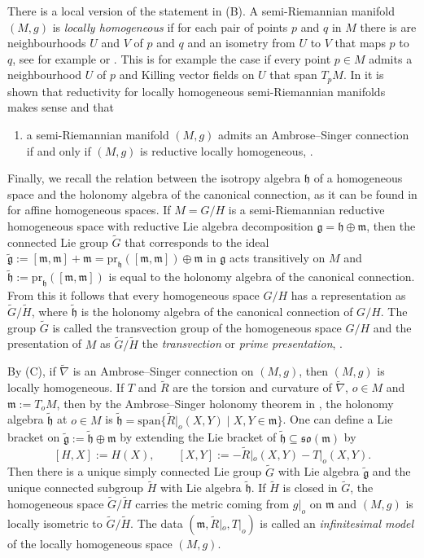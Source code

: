 \documentclass[11pt,a4paper]{amsart}
\def\blu{\color[rgb]{0,0,1}}
\newcommand{\tg}{\widetilde{\g}}
\renewcommand{\th}{\widetilde{\h}}
\newcommand{\tnab}{\widetilde{\nabla}}
\newcommand{\tR}{\widetilde{R}}
\newcommand{\g}{\mathfrak{g}}
\newcommand{\h}{\mathfrak{h}}
\newcommand{\m}{\mathfrak{m}}
\newcommand{\+}{\oplus}
\newcommand{\so}{\mathfrak{so}}
\renewcommand{\span}{\mathrm{span}}
\newcommand{\1}{\mathbf{1}}
\newcommand{\Tcom}[1]{\marginpar{\scriptsize \blu\tt #1}}
\newcommand{\<}{\langle}
\renewcommand{\>}{\rangle}
\theoremstyle{definition}
\theoremstyle{plain}
\numberwithin{equation}{section}
\begin{document}
There is a local version of the statement in (B). A semi-Riemannian manifold $(M,g)$ is {\em locally homogeneous} if for each pair  of points  $p$ and $q$ in $M$ there is are neighbourhoods $U$ and $V$ of $p$ and $q$ and an isometry from $U$ to $V$ that maps $p$ to $q$, see for example \cite[Section 7.3]{ambra-gromov91} or \cite[Definition 1.4.6]{CalvarusoCastrillon-Lopez19}. This is for example the case if every point $p\in M$ admits a neighbourhood $U$ of $p$ and Killing vector fields on $U$ that span $T_pM$. In \cite[Section 3.1]{CalvarusoCastrillon-Lopez19} it is shown that reductivity for locally homogeneous semi-Riemannian manifolds makes sense and that
 \begin{enumerate}
\item[(C)] a semi-Riemannian manifold $(M,g)$ admits an Ambrose--Singer connection if and only if $(M,g)$ is reductive locally homogeneous, \cite[Theorems 3.1.14 and 3.1.15]{CalvarusoCastrillon-Lopez19}.
\end{enumerate}
Finally, we recall the relation between the isotropy algebra $\h$ of a homogeneous space and the holonomy algebra of the canonical connection, as it can be found in \cite[Theorems I.25 and I.33]{Kowalski80} for affine homogeneous spaces.
If
 $M=G/H$ is a semi-Riemannian reductive homogeneous space with reductive Lie algebra decomposition $\g=\h\+\m$, then the connected Lie group $\widetilde{G}$ that corresponds to the ideal $\widetilde{\g}:=[\m,\m]+\m=\mathrm{pr}_\h([\m,\m])\+\m$ in $\g$ acts transitively on $M$ and  $\th:=\mathrm{pr}_\h([\m,\m])$ is equal to the holonomy algebra of the canonical connection.  
From this it follows that every homogeneous space $G/H$ has a representation as $\widetilde{G}/\widetilde{H}$,  where $\th$ is the holonomy algebra of the canonical connection of $G/H$. The group $\widetilde{G}$ is  called the transvection group of the homogeneous space $G/H$ and the presentation of $M$ as $\widetilde{G}/\widetilde{H}$ the {\em transvection} or {\em prime presentation}, 
\cite[page 41]{Kowalski80}. 

By  (C), if $\tnab$ is an Ambrose--Singer connection on $(M,g)$, then $(M,g)$ is locally homogeneous. If $T$ and  $\tR$ are the torsion and curvature of $\tnab$, $o\in M$ and $\m:=T_oM$, then by the Ambrose--Singer holonomy theorem in \cite{as}, 
the  holonomy algebra $\th$ at $o\in M$
is  $\th  =\span\{\tR|_o(X,Y)\mid  X,Y\in \m\}$. 
One can define a Lie bracket on $\tg:=\th\+\m$ by extending the Lie bracket of $\th\subseteq \so(\m)$ by
\[[ H,X]:=H(X),\qquad [ X,Y ]:=-\tR|_o (X,Y)-T|_o(X,Y).\]
Then there is a unique simply connected Lie group $\widetilde{G}$ with Lie algebra $\tg$ and the unique connected subgroup $\widetilde{H}$ with Lie algebra $\th$. If $\widetilde{H}$ is closed in $\widetilde{G}$, the homogeneous space $\widetilde{G}/\widetilde{H}$ carries the metric coming from $g|_o$ on $\m$ and  $(M,g)$ is locally isometric to $\widetilde{G}/\widetilde{H}$. The data $(\m, \tR|_o, T|_o)$ is  called an {\em infinitesimal model} of the locally homogeneous space $(M,g)$.  
%
%
\end{document}
